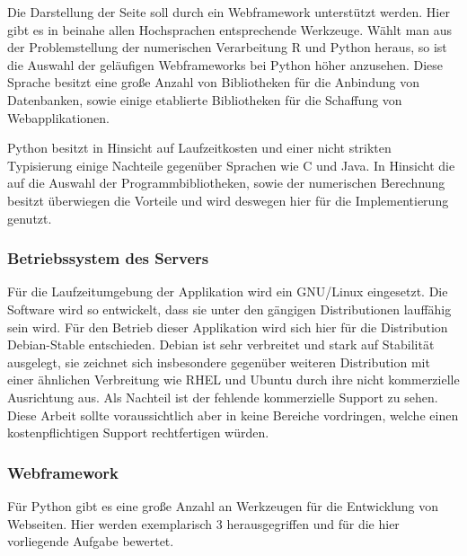 Die Darstellung der Seite soll durch ein Webframework unterstützt werden. Hier gibt es in beinahe allen Hochsprachen entsprechende Werkzeuge. Wählt man aus der Problemstellung der numerischen Verarbeitung R und Python heraus, so ist die Auswahl der geläufigen Webframeworks bei Python höher anzusehen. Diese Sprache besitzt eine große Anzahl von Bibliotheken für die Anbindung von Datenbanken, sowie einige etablierte Bibliotheken für die Schaffung von Webapplikationen.  

Python besitzt in Hinsicht auf Laufzeitkosten und einer nicht strikten Typisierung einige Nachteile gegenüber Sprachen wie C und Java. In Hinsicht die auf die Auswahl der  Programmbibliotheken, sowie der numerischen Berechnung besitzt überwiegen die Vorteile und wird deswegen hier für die Implementierung genutzt.



\subsubsection{Betriebssystem des Servers}


Für die Laufzeitumgebung der Applikation wird ein GNU/Linux eingesetzt. Die Software wird so entwickelt, dass sie unter den gängigen Distributionen lauffähig sein wird. Für den Betrieb dieser Applikation wird sich hier für die Distribution Debian-Stable entschieden. Debian ist sehr verbreitet und stark auf Stabilität ausgelegt, sie zeichnet sich insbesondere gegenüber weiteren Distribution mit einer ähnlichen Verbreitung wie RHEL und Ubuntu durch ihre nicht kommerzielle Ausrichtung aus.  Als Nachteil ist der fehlende kommerzielle Support zu sehen. Diese Arbeit sollte voraussichtlich aber in keine Bereiche vordringen, welche einen kostenpflichtigen Support rechtfertigen würden.

\subsubsection{Webframework}

Für Python gibt es eine große Anzahl an Werkzeugen für die Entwicklung von Webseiten. Hier werden exemplarisch 3 herausgegriffen und für die hier vorliegende Aufgabe bewertet.

